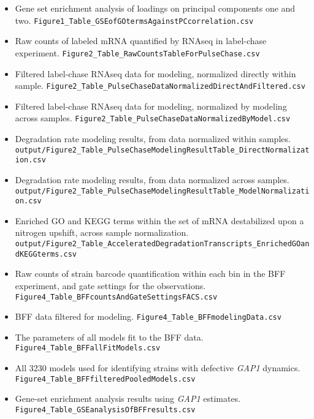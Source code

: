 \begin{itemize}
  \setlength\itemsep{1em}
  \item Gene set enrichment analysis of loadings on principal 
    components one and two.
    \texttt{Figure1\_Table\_GSEofGOtermsAgainstPCcorrelation.csv}
    \label{microarrayPCAgsea}
  \item Raw counts of labeled mRNA quantified by RNAseq in 
    label-chase experiment.
    \texttt{Figure2\_Table\_RawCountsTableForPulseChase.csv}
    \label{itm:dme211raw}
  \item Filtered label-chase RNAseq data for modeling, normalized 
    directly within sample.
    \texttt{Figure2\_Table\_PulseChaseDataNormalizedDirectAndFiltered.csv}
    \label{itm:dme211filterDirect}
  \item Filtered label-chase RNAseq data for modeling, normalized by
    modeling across samples.
    \texttt{Figure2\_Table\_PulseChaseDataNormalizedByModel.csv}
    \label{itm:dme211filterModel}
  \item Degradation rate modeling results, from data normalized 
    within samples.
    \texttt{output/Figure2\_Table\_PulseChaseModelingResultTable\_DirectNormalization.csv}
    \label{itm:dme211resultsDirect}
  \item Degradation rate modeling results, from data normalized 
    across samples.
    \texttt{output/Figure2\_Table\_PulseChaseModelingResultTable\_ModelNormalization.csv}
    \label{itm:dme211resultsModel}
  \item Enriched GO and KEGG terms within the set of mRNA 
    destabilized upon a nitrogen upshift, across sample normalization.
    \texttt{output/Figure2\_Table\_AcceleratedDegradationTranscripts\_EnrichedGOandKEGGterms.csv}
    \label{itm:dme211goAndKegg}
  \item Raw counts of strain barcode quantification within each bin
    in the BFF experiment, and gate settings for the observations.
    \texttt{Figure4\_Table\_BFFcountsAndGateSettingsFACS.csv}
    \label{itm:dme209rawCountsGates}
  \item BFF data filtered for modeling.
    \texttt{Figure4\_Table\_BFFmodelingData.csv}
    \label{itm:dme209modelData}
  \item The parameters of all models fit to the BFF data.
    \texttt{Figure4\_Table\_BFFallFitModels.csv}
    \label{itm:dme209allFits}
  \item All 3230 models used for identifying strains with defective 
    \textit{GAP1} dynamics.
    \texttt{Figure4\_Table\_BFFfilteredPooledModels.csv}
    \label{itm:dme209pooledFits}
  \item Gene-set enrichment analysis results using \textit{GAP1} 
    estimates.
    \texttt{Figure4\_Table\_GSEanalysisOfBFFresults.csv}
    \label{itm:dme209gsea}
\end{itemize}

